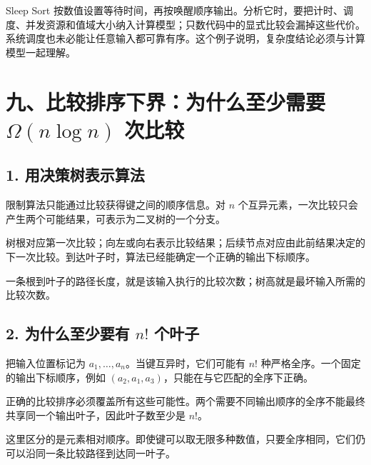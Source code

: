 \documentclass[
  UTF8,fontset=none,zihao=5]{ctexart}
\let\OldSection\section
\renewcommand{\section}{\Needspace{5\baselineskip}\OldSection}
\let\OldSubsection\subsection
\renewcommand{\subsection}{\Needspace{4\baselineskip}\OldSubsection}
\begin{document}
Sleep Sort
按数值设置等待时间，再按唤醒顺序输出。分析它时，要把计时、调度、并发资源和值域大小纳入计算模型；只数代码中的显式比较会漏掉这些代价。系统调度也未必能让任意输入都可靠有序。这个例子说明，复杂度结论必须与计算模型一起理解。

\hypertarget{ux4e5dux6bd4ux8f83ux6392ux5e8fux4e0bux754cux4e3aux4ec0ux4e48ux81f3ux5c11ux9700ux8981-omeganlog-n-ux6b21ux6bd4ux8f83}{%
\section{\texorpdfstring{九、比较排序下界：为什么至少需要
\(\Omega(n\log n)\)
次比较}{九、比较排序下界：为什么至少需要 \textbackslash Omega(n\textbackslash log n) 次比较}}\label{ux4e5dux6bd4ux8f83ux6392ux5e8fux4e0bux754cux4e3aux4ec0ux4e48ux81f3ux5c11ux9700ux8981-omeganlog-n-ux6b21ux6bd4ux8f83}}

\hypertarget{ux7528ux51b3ux7b56ux6811ux8868ux793aux7b97ux6cd5}{%
\subsection{1.
用决策树表示算法}\label{ux7528ux51b3ux7b56ux6811ux8868ux793aux7b97ux6cd5}}

限制算法只能通过比较获得键之间的顺序信息。对 \(n\)
个互异元素，一次比较只会产生两个可能结果，可表示为二叉树的一个分支。

树根对应第一次比较；向左或向右表示比较结果；后续节点对应由此前结果决定的下一次比较。到达叶子时，算法已经能确定一个正确的输出下标顺序。

一条根到叶子的路径长度，就是该输入执行的比较次数；树高就是最坏输入所需的比较次数。

\hypertarget{ux4e3aux4ec0ux4e48ux81f3ux5c11ux8981ux6709-n-ux4e2aux53f6ux5b50}{%
\subsection{\texorpdfstring{2. 为什么至少要有 \(n!\)
个叶子}{2. 为什么至少要有 n! 个叶子}}\label{ux4e3aux4ec0ux4e48ux81f3ux5c11ux8981ux6709-n-ux4e2aux53f6ux5b50}}

把输入位置标记为 \(a_1,\ldots,a_n\)。当键互异时，它们可能有 \(n!\)
种严格全序。一个固定的输出下标顺序，例如
\((a_2,a_1,a_3)\)，只能在与它匹配的全序下正确。

正确的比较排序必须覆盖所有这些可能性。两个需要不同输出顺序的全序不能最终共享同一个输出叶子，因此叶子数至少是
\(n!\)。

这里区分的是元素相对顺序。即使键可以取无限多种数值，只要全序相同，它们仍可以沿同一条比较路径到达同一叶子。
\end{document}
